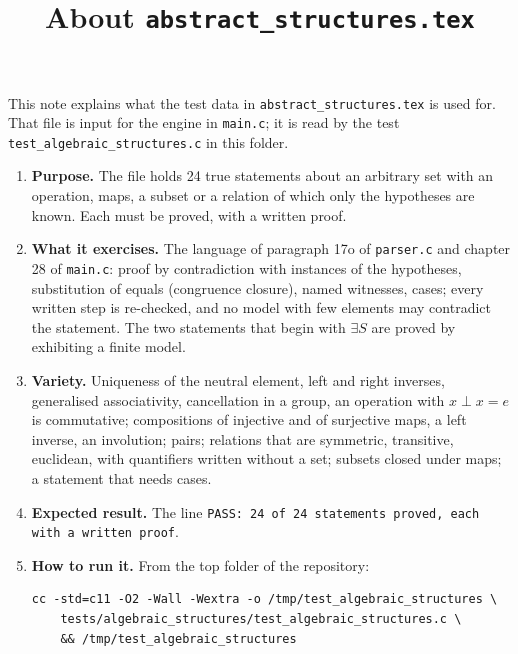 \documentclass[11pt,a4paper]{article}
\title{About \texttt{abstract\_structures.tex}}
\author{}
\date{}
\begin{document}
\maketitle
This note explains what the test data in \texttt{abstract\_structures.tex} is used for. That file is input for the engine in \texttt{main.c}; it is read by the test \texttt{test\_algebraic\_structures.c} in this folder.

\begin{enumerate}
\item \textbf{Purpose.} The file holds 24 true statements about an arbitrary set with an operation, maps, a subset or a relation of which only the hypotheses are known. Each must be proved, with a written proof.

\item \textbf{What it exercises.} The language of paragraph 17o of \texttt{parser.c} and chapter 28 of \texttt{main.c}: proof by contradiction with instances of the hypotheses, substitution of equals (congruence closure), named witnesses, cases; every written step is re-checked, and no model with few elements may contradict the statement. The two statements that begin with $\exists S$ are proved by exhibiting a finite model.

\item \textbf{Variety.} Uniqueness of the neutral element, left and right inverses, generalised associativity, cancellation in a group, an operation with $x \perp x = e$ is commutative; compositions of injective and of surjective maps, a left inverse, an involution; pairs; relations that are symmetric, transitive, euclidean, with quantifiers written without a set; subsets closed under maps; a statement that needs cases.

\item \textbf{Expected result.} The line \texttt{PASS: 24 of 24 statements proved, each with a written proof}.

\item \textbf{How to run it.} From the top folder of the repository:
\begin{verbatim}
cc -std=c11 -O2 -Wall -Wextra -o /tmp/test_algebraic_structures \
    tests/algebraic_structures/test_algebraic_structures.c \
    && /tmp/test_algebraic_structures
\end{verbatim}
\end{enumerate}
\end{document}

